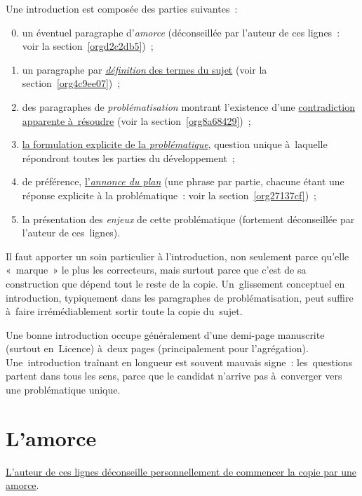 \documentclass[a4paper,12pt]{report}
\begin{document}
Une introduction est composée des parties suivantes :

\begin{enumerate}
\setcounter{enumi}{-1}
\item un éventuel paragraphe d'\emph{amorce} (déconseillée par l'auteur de
ces lignes : voir la section \ref{orgd2c2db5}) ;

\item un paragraphe par \uline{\emph{définition} des termes du sujet} (voir la
section \ref{org4c9ee07}) ;

\item des paragraphes de \emph{problématisation} montrant l'existence d'une
\uline{contradiction apparente à résoudre} (voir la
section \ref{org8a68429}) ;

\item \uline{la formulation explicite de la \emph{problématique}}, question unique
à laquelle répondront toutes les parties du développement ;

\item de préférence, \uline{l'\emph{annonce du plan}} (une phrase par partie, chacune
étant une réponse explicite à la problématique : voir la
section \ref{org27137cf}) ;

\setcounter{enumi}{-1}
\item la présentation des \emph{enjeux} de cette problématique (fortement
déconseillée par l'auteur de ces lignes).
\end{enumerate}

Il faut apporter un soin particulier à l'introduction, non seulement
parce qu'elle « marque » le plus les correcteurs, mais surtout parce que
c'est de sa construction que dépend tout le reste de la copie.
Un glissement conceptuel en introduction, typiquement dans les
paragraphes de problématisation, peut suffire à faire irrémédiablement
sortir toute la copie du sujet.

Une bonne introduction occupe généralement d'une demi-page manuscrite
(surtout en Licence) à deux pages (principalement pour l'agrégation).
Une introduction traînant en longueur est souvent mauvais signe :
les questions partent dans tous les sens, parce que le candidat n'arrive
pas à converger vers une problématique unique.

\section{L'amorce}
\label{sec:org0d506a0}
\label{orgd2c2db5}

\uline{L'auteur de ces lignes déconseille personnellement de commencer la
copie par une amorce}.
\end{document}
